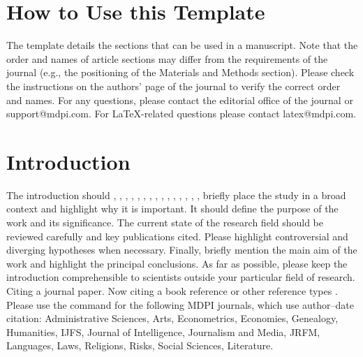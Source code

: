 \documentclass[journal,article,submit,pdftex,moreauthors]{Definitions/mdpi}
\begin{document}
\setcounter{section}{-1} %
\section{How to Use this Template}

The template details the sections that can be used in a manuscript. Note that the order and names of article sections may differ from the requirements of the journal (e.g., the positioning of the Materials and Methods section). Please check the instructions on the authors' page of the journal to verify the correct order and names. For any questions, please contact the editorial office of the journal or support@mdpi.com. For LaTeX-related questions please contact latex@mdpi.com.%



\section{Introduction}

The introduction should  \cite{LAMA2021e07419}, \cite{KAVAKIOTIS2017104}, \cite{kopitar2020early}, \cite{Howlader}, \cite{ijerph18063317}, \cite{Lai}, \cite{fazakis}, \cite{Zou}, \cite{DeSilva}, \cite{Dinh}, \cite{zhang}, \cite{Fregoso}, \cite{Xiong}, \cite{Rufo}, \cite{Benita}, \cite{Dritsas}  briefly place the study in a broad context and highlight why it is important. It should define the purpose of the work and its significance. The current state of the research field should be reviewed carefully and key publications cited. Please highlight controversial and diverging hypotheses when necessary. Finally, briefly mention the main aim of the work and highlight the principal conclusions. As far as possible, please keep the introduction comprehensible to scientists outside your particular field of research. Citing a journal paper. Now citing a book reference  or other reference types . Please use the command  for the following MDPI journals, which use author--date citation: Administrative Sciences, Arts, Econometrics, Economies, Genealogy, Humanities, IJFS, Journal of Intelligence, Journalism and Media, JRFM, Languages, Laws, Religions, Risks, Social Sciences, Literature.
\end{document}
